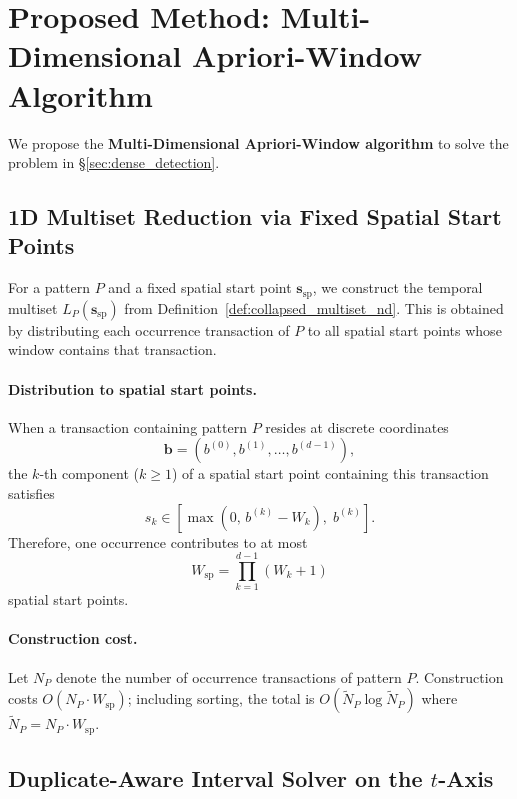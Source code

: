 \section{Proposed Method: Multi-Dimensional Apriori-Window Algorithm}
\label{sec:method}

We propose the \textbf{Multi-Dimensional Apriori-Window algorithm}
to solve the problem in \S\ref{sec:dense_detection}.

\subsection{1D Multiset Reduction via Fixed Spatial Start Points}\label{sec:binsearch}

For a pattern $P$ and a fixed spatial start point
$\bm{s}_{\mathrm{sp}}$,
we construct the temporal multiset
$L_P(\bm{s}_{\mathrm{sp}})$
from Definition~\ref{def:collapsed_multiset_nd}.
This is obtained by distributing each occurrence transaction of $P$
to all spatial start points whose window contains that transaction.

\paragraph{Distribution to spatial start points.}
When a transaction containing pattern $P$
resides at discrete coordinates
\[
  \bm{b} = (b^{(0)}, b^{(1)}, \ldots, b^{(d-1)}),
\]
the $k$-th component ($k \geq 1$)
of a spatial start point containing this transaction satisfies
\[
  s_k \in [\max(0,\, b^{(k)} - W_k),\; b^{(k)}].
\]
Therefore, one occurrence contributes to at most
\[
  W_{\mathrm{sp}} = \prod_{k=1}^{d-1} (W_k + 1)
\]
spatial start points.

\paragraph{Construction cost.}
Let $N_P$ denote the number of occurrence transactions of pattern $P$.
Construction costs $O(N_P \cdot W_{\mathrm{sp}})$;
including sorting, the total is $O(\widetilde N_P \log \widetilde N_P)$
where $\widetilde N_P = N_P \cdot W_{\mathrm{sp}}$.

\subsection{Duplicate-Aware Interval Solver on the $t$-Axis}\label{sec:t_stride}

